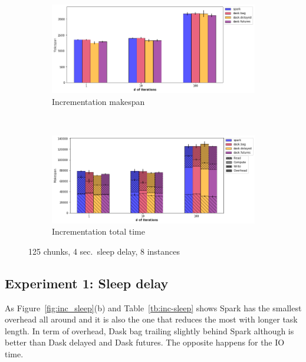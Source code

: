 \documentclass[conference]{IEEEtran}
\begin{document}
\begin{figure}[!t]
    \centering
    \begin{subfigure}[b]{\columnwidth}
        \includegraphics[clip,width=\columnwidth]{images/inc_itr.png}%
        \caption{Incrementation makespan}\label{fig:inc_ms_chunk}
    \end{subfigure}
    \\
    \begin{subfigure}[b]{\columnwidth}
        \includegraphics[clip,width=\columnwidth]{images/inc_idle_itr.png}%
        \caption{Incrementation total time}\label{fig:inc_tt_chunk}
    \end{subfigure}
    \caption{125 chunks, 4 sec.\ sleep delay, 8 instances}\label{fig:inc_itr}
\end{figure}


\subsection{Experiment 1: Sleep delay}
As Figure~\ref{fig:inc_sleep}(b) and Table~\ref{tb:inc-sleep} shows Spark has the
smallest overhead all around and it is also the one that reduces the most with longer
task length. In term of overhead, Dask bag trailing slightly behind Spark although is
better than Dask delayed and Dask futures. The opposite happens for the IO time.
\end{document}
